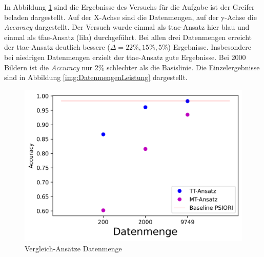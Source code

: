 	In Abbildung \ref{img:VergleichDatenmenge} sind die Ergebnisse des Versuchs für die Aufgabe ist der Greifer beladen dargestellt. Auf der X-Achse sind die Datenmengen, auf der y-Achse die \textit{Accuracy} dargestellt. Der Versuch wurde einmal als \ac{ttae}-Ansatz hier blau und einmal als \ac{tfae}-Ansatz (lila) durchgeführt. Bei allen drei Datenmengen erreicht der \ac{ttae}-Ansatz deutlich bessere ($\Delta=22\%,15\%,5\%$) Ergebnisse. Insbesondere bei niedrigen Datenmengen erzielt der \ac{ttae}-Ansatz gute Ergebnisse. Bei 2000 Bildern ist die \textit{Accuracy} nur 2\% schlechter als die Basislinie. Die Einzelergebnisse sind in Abbildung \ref{img:DatenmengenLeistung} dargestellt.   
	\begin{figure}[h]
		\centering
		\includegraphics[width=1\textwidth, center]{bilder/Hauptteil/Transfer_Logs_Datenmenge//Acc_compare_Logs_data.png}
		\caption{Vergleich-Ansätze Datenmenge}
		\label{img:VergleichDatenmenge}
	\end{figure}  	
